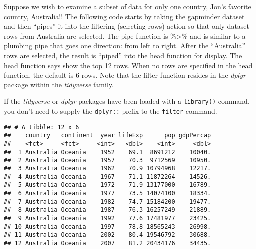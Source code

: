 \documentclass[
]{book}
\newenvironment{Shaded}{\begin{snugshade}}{\end{snugshade}}
\newcommand{\CommentTok}[1]{\textcolor[rgb]{0.56,0.35,0.01}{\textit{#1}}}
\newcommand{\DataTypeTok}[1]{\textcolor[rgb]{0.13,0.29,0.53}{#1}}
\newcommand{\DecValTok}[1]{\textcolor[rgb]{0.00,0.00,0.81}{#1}}
\newcommand{\KeywordTok}[1]{\textcolor[rgb]{0.13,0.29,0.53}{\textbf{#1}}}
\newcommand{\NormalTok}[1]{#1}
\newcommand{\OperatorTok}[1]{\textcolor[rgb]{0.81,0.36,0.00}{\textbf{#1}}}
\newcommand{\StringTok}[1]{\textcolor[rgb]{0.31,0.60,0.02}{#1}}
\begin{document}
Suppose we wish to examine a subset of data for only one country, Jon's favorite country, Australia!! The following code starts by taking the gapminder dataset and then ``pipes'' it into the filtering (selecting rows) action so that only dataset rows from Australia are selected. The pipe function is \%\textgreater\% and is similar to a plumbing pipe that goes one direction: from left to right. After the ``Australia'' rows are selected, the result is ``piped'' into the head function for display. The head function says show the top 12 rows. When no rows are specified in the head function, the default is 6 rows. Note that the filter function resides in the \emph{dplyr} package within the \emph{tidyverse} family.

If the \emph{tidyverse} or \emph{dplyr} packages have been loaded with a \texttt{library()} command, you don't need to supply the \texttt{dplyr::} prefix to the \texttt{filter} command.

\begin{Shaded}
\end{Shaded}

\begin{verbatim}
## # A tibble: 12 x 6
##    country   continent  year lifeExp      pop gdpPercap
##    <fct>     <fct>     <int>   <dbl>    <int>     <dbl>
##  1 Australia Oceania    1952    69.1  8691212    10040.
##  2 Australia Oceania    1957    70.3  9712569    10950.
##  3 Australia Oceania    1962    70.9 10794968    12217.
##  4 Australia Oceania    1967    71.1 11872264    14526.
##  5 Australia Oceania    1972    71.9 13177000    16789.
##  6 Australia Oceania    1977    73.5 14074100    18334.
##  7 Australia Oceania    1982    74.7 15184200    19477.
##  8 Australia Oceania    1987    76.3 16257249    21889.
##  9 Australia Oceania    1992    77.6 17481977    23425.
## 10 Australia Oceania    1997    78.8 18565243    26998.
## 11 Australia Oceania    2002    80.4 19546792    30688.
## 12 Australia Oceania    2007    81.2 20434176    34435.
\end{verbatim}
\end{document}
